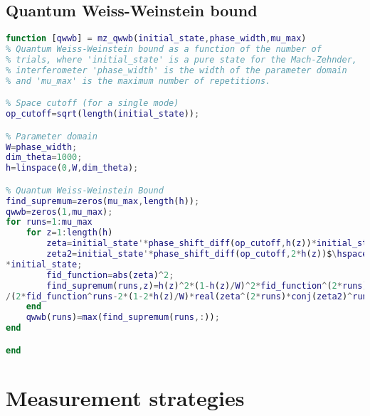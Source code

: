 \subsection{Quantum Weiss-Weinstein bound}
\label{subsec:qwwbnum}

\begin{lstlisting}[language=Matlab, mathescape=true]
function [qwwb] = mz_qwwb(initial_state,phase_width,mu_max)
% Quantum Weiss-Weinstein bound as a function of the number of 
% trials, where 'initial_state' is a pure state for the Mach-Zehnder,
% interferometer 'phase_width' is the width of the parameter domain 
% and 'mu_max' is the maximum number of repetitions. 

% Space cutoff (for a single mode)
op_cutoff=sqrt(length(initial_state));

% Parameter domain
W=phase_width;
dim_theta=1000;
h=linspace(0,W,dim_theta);

% Quantum Weiss-Weinstein Bound
find_supremum=zeros(mu_max,length(h));
qwwb=zeros(1,mu_max);
for runs=1:mu_max
    for z=1:length(h)
        zeta=initial_state'*phase_shift_diff(op_cutoff,h(z))*initial_state;
        zeta2=initial_state'*phase_shift_diff(op_cutoff,2*h(z))$\hspace{0.15em}\swarrow$
*initial_state;
        fid_function=abs(zeta)^2;
        find_supremum(runs,z)=h(z)^2*(1-h(z)/W)^2*fid_function^(2*runs)$\hspace{0.15em}\swarrow$
/(2*fid_function^runs-2*(1-2*h(z)/W)*real(zeta^(2*runs)*conj(zeta2)^runs));
    end
    qwwb(runs)=max(find_supremum(runs,:));
end

end
\end{lstlisting}

\section{Measurement strategies}
\label{sec:pomnum}

